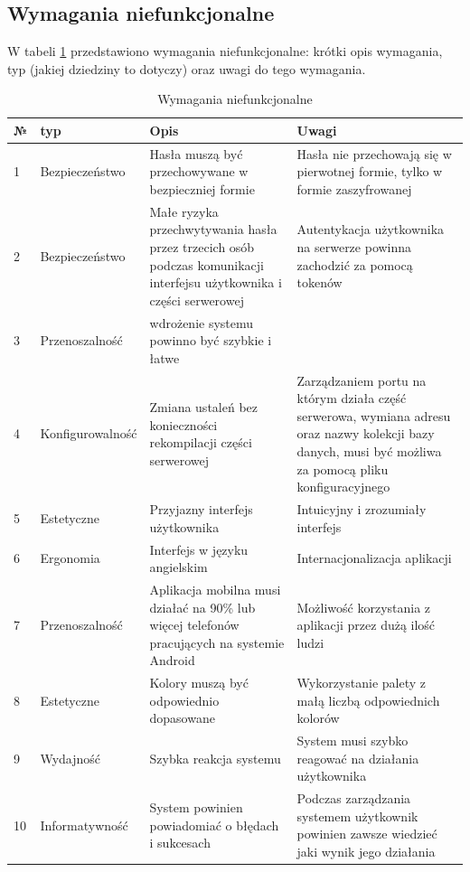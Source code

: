 \subsection{Wymagania niefunkcjonalne}
W tabeli \ref{tab:wymaganianiefunkcjonalne} przedstawiono wymagania niefunkcjonalne: krótki opis wymagania, typ (jakiej dziedziny to dotyczy) oraz uwagi do tego wymagania.
\begin{table}[htb] \small
\centering
    \caption{Wymagania niefunkcjonalne}
    \label{tab:wymaganianiefunkcjonalne}
    \begin{tabularx}{\linewidth}{| l| l |X | X |} 
    \hline
    № & typ & Opis & Uwagi \\
    \hline
    1 & Bezpieczeństwo & Hasła muszą być przechowywane w bezpieczniej formie & Hasła nie przechowają się w pierwotnej formie, tylko w formie zaszyfrowanej \\ 
    \hline
    2 & Bezpieczeństwo & Małe ryzyka przechwytywania hasła przez trzecich osób podczas komunikacji interfejsu użytkownika i części serwerowej & Autentykacja użytkownika na serwerze powinna zachodzić za pomocą tokenów \\ 
    \hline
    3 & Przenoszalność & wdrożenie systemu powinno być szybkie i łatwe & \\ 
    \hline
    4 & Konfigurowalność & Zmiana ustaleń bez konieczności rekompilacji części serwerowej & Zarządzaniem portu na którym działa część serwerowa, wymiana adresu oraz nazwy kolekcji bazy danych, musi być możliwa za pomocą pliku konfiguracyjnego \\ 
    \hline
    5 & Estetyczne & Przyjazny interfejs użytkownika & Intuicyjny i zrozumiały interfejs \\ 
    \hline
    6 & Ergonomia & Interfejs w języku angielskim & Internacjonalizacja aplikacji \\
    \hline
    7 & Przenoszalność & Aplikacja mobilna musi działać na 90\% lub więcej telefonów pracujących na systemie Android & Możliwość korzystania z aplikacji przez dużą ilość ludzi \\
    \hline
    8 & Estetyczne & Kolory muszą być odpowiednio dopasowane & Wykorzystanie palety z małą liczbą odpowiednich kolorów  \\
    \hline
    9 & Wydajność & Szybka reakcja systemu & System musi szybko reagować na działania użytkownika \\ %
    \hline
    10 & Informatywność & System powinien powiadomiać o błędach i sukcesach  & Podczas zarządzania systemem użytkownik powinien zawsze wiedzieć jaki wynik jego działania \\

\end{tabularx}
\end{table}
